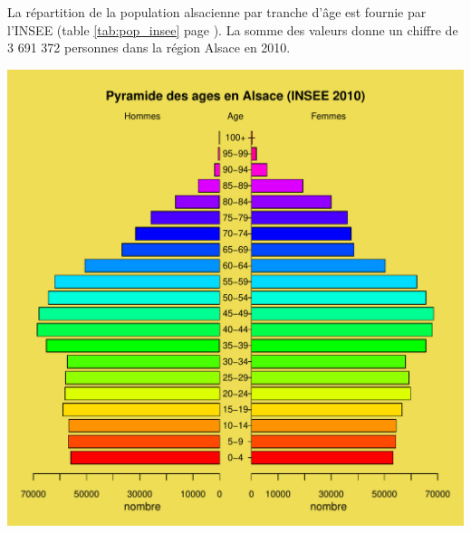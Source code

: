 \documentclass[12pt,english,french,twoside]{book}\usepackage[]{graphicx}\usepackage[]{color}
\makeatletter
\def\maxwidth{ %
  \ifdim\Gin@nat@width>\linewidth
    \linewidth
  \else
    \Gin@nat@width
  \fi
}
\newenvironment{knitrout}{}{} %
\makeatother
\begin{document}
La répartition de la population alsacienne par tranche d'âge est fournie par l'INSEE (table \ref{tab:pop_insee} page \pageref{tab:pop_insee}). La somme des valeurs donne un chiffre de 3 691 372 personnes dans la région Alsace en 2010.

\begin{center}
\begin{knitrout}
\color{fgcolor}
\includegraphics[width=\maxwidth]{figure/pyramide_graphe} 

\end{knitrout}

\label{fig:pyr_age_insee}
\end{center}

\end{document}

